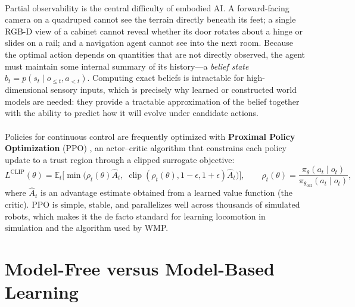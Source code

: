 \documentclass[12pt,a4paper,final]{extreport}
\begin{document}
\paragraph{} Partial observability is the central difficulty of embodied AI. A forward-facing camera on a quadruped cannot see the terrain directly beneath its feet; a single RGB-D view of a cabinet cannot reveal whether its door rotates about a hinge or slides on a rail; and a navigation agent cannot see into the next room. Because the optimal action depends on quantities that are not directly observed, the agent must maintain some internal summary of its history---a \emph{belief state} $b_t = p(s_t \mid o_{\le t}, a_{<t})$. Computing exact beliefs is intractable for high-dimensional sensory inputs, which is precisely why learned or constructed world models are needed: they provide a tractable approximation of the belief together with the ability to predict how it will evolve under candidate actions.

\paragraph{} Policies for continuous control are frequently optimized with \textbf{Proximal Policy Optimization} (PPO) \cite{ppo}, an actor--critic algorithm that constrains each policy update to a trust region through a clipped surrogate objective:
\begin{equation}
L^{\mathrm{CLIP}}(\theta)=\mathbb{E}_t\Big[\min\big(\rho_t(\theta)\hat{A}_t,\;\operatorname{clip}(\rho_t(\theta),1-\epsilon,1+\epsilon)\hat{A}_t\big)\Big],\qquad \rho_t(\theta)=\frac{\pi_\theta(a_t\mid o_t)}{\pi_{\theta_{\mathrm{old}}}(a_t\mid o_t)},
\label{eq:ppo}
\end{equation}
where $\hat{A}_t$ is an advantage estimate obtained from a learned value function (the critic). PPO is simple, stable, and parallelizes well across thousands of simulated robots, which makes it the de facto standard for learning locomotion in simulation and the algorithm used by WMP.

\section{Model-Free versus Model-Based Learning}
\end{document}
